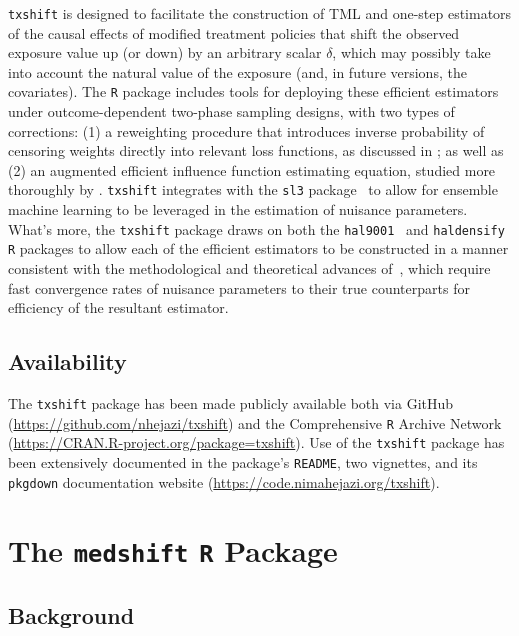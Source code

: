 \texttt{txshift} is designed to facilitate the construction of TML and one-step
estimators of the causal effects of modified treatment policies that shift the
observed exposure value up (or down) by an arbitrary scalar $\delta$, which may
possibly take into account the natural value of the exposure (and, in future
versions, the covariates). The \texttt{R} package includes tools for deploying
these efficient estimators under outcome-dependent two-phase sampling designs,
with two types of corrections: (1) a reweighting procedure that introduces
inverse probability of censoring weights directly into relevant loss functions,
as discussed in \citet{rose2011targeted2sd}; as well as (2) an augmented
efficient influence function estimating equation, studied more thoroughly by
\citet{hejazi2020efficient}. \texttt{txshift} integrates with the \texttt{sl3}
package~\citep{coyle2021sl3} to allow for ensemble machine learning to be
leveraged in the estimation of nuisance parameters. What's more, the
\texttt{txshift} package draws on both the
\texttt{hal9001}~\citep{coyle2021hal9001,hejazi2020hal9001} and
\texttt{haldensify}~\citep{hejazi2021haldensify} \texttt{R} packages to allow
each of the efficient estimators to be constructed in a manner consistent with
the methodological and theoretical advances of~\citet{hejazi2020efficient},
which require fast convergence rates of nuisance parameters to their true
counterparts for efficiency of the resultant estimator.

\subsection{Availability}

The \texttt{txshift} package has been made publicly available both via
GitHub (\url{https://github.com/nhejazi/txshift}) and the Comprehensive
\texttt{R} Archive Network (\url{https://CRAN.R-project.org/package=txshift}).
Use of the \texttt{txshift} package has been extensively documented in the
package's \texttt{README}, two vignettes, and its \texttt{pkgdown} documentation
website (\url{https://code.nimahejazi.org/txshift}).

\section{The \texttt{medshift} \texttt{R} Package}\label{pkg_medshift}

\subsection{Background}

